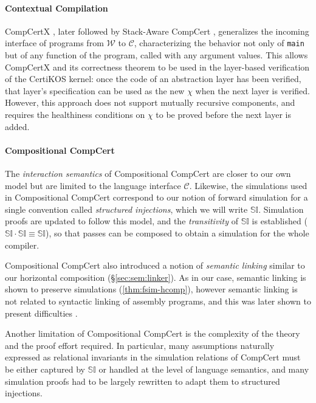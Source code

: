 \documentclass[sigplan,screen]{acmart}
\begin{document}
\paragraph{Contextual Compilation} %

CompCertX \cite{popl15},
later followed by Stack-Aware CompCert \cite{stackaware},
generalizes
the incoming interface of programs
from $\mathcal{W}$ to $\mathcal{C}$,
characterizing the behavior
not only of \texttt{main}
but of any function of the program,
called with any argument values.
This allows CompCertX and its correctness theorem
to be used in the layer-based verification of
the CertiKOS kernel:
once the code of an abstraction layer has been verified,
that layer's specification can be used as the new $\chi$
when the next layer is verified.
However,
this approach does not support
mutually recursive components,
and requires the healthiness conditions on $\chi$
to be proved before the next layer is added.


\paragraph{Compositional CompCert} %

The \emph{interaction semantics} of
Compositional CompCert \cite{compcompcert}
are closer to our own model
but are limited to the language interface $\mathcal{C}$.
Likewise, the simulations used in Compositional CompCert
correspond to our notion of forward simulation
for a single convention called \emph{structured injections},
which we will write $\mathbb{SI}$.
Simulation proofs are updated to follow this model,
and the \emph{transitivity} of $\mathbb{SI}$ is established
($\mathbb{SI} \cdot \mathbb{SI} \equiv \mathbb{SI}$),
so that passes can be composed
to obtain a simulation for the whole compiler.

Compositional CompCert also introduced a notion of \emph{semantic linking}
similar to our horizontal composition
(\S\ref{sec:sem:linker}).
As in our case,
semantic linking is shown to preserve simulations
(\autoref{thm:fsim-hcomp}),
however semantic linking is not related to
syntactic linking of assembly programs,
and this was later shown to present difficulties \cite{compcertm}.

Another limitation of Compositional CompCert
is the complexity of the theory
and the proof effort required.
In particular,
many assumptions naturally expressed as
relational invariants in the simulation relations of CompCert
must be either captured by $\mathbb{SI}$
or handled at the level of language semantics,
and many simulation proofs
had to be largely rewritten to adapt them to
structured injections.
\end{document}
